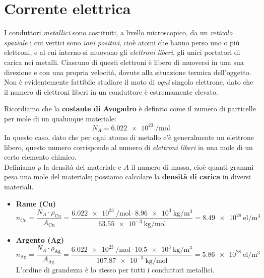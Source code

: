 \section{Corrente elettrica}
I conduttori \textit{metallici} sono costituiti, a livello microscopico, da un \textit{reticolo spaziale} i cui vertici sono \textit{ioni positivi}, cioè atomi che hanno perso uno o più elettroni, e al cui interno si muovono gli \textit{elettroni liberi}, gli unici portatori di carica nei metalli.
Ciascuno di questi elettroni è libero di muoversi in una sua direzione e con una propria velocità, dovute alla situazione termica dell'oggetto. Non è evidentemente fattibile studiare il moto di \textit{ogni} singolo elettrone, dato che il numero di elettroni liberi in un conduttore è estremamente elevato.
\begin{examplewt}
	Ricordiamo che la \textbf{costante di Avogadro} è definito come il numero di particelle per mole di un qualunque materiale:
	\begin{equation*}
		N_A=\SI[exponent-product=\ensuremath{\cdot}]{6,022e23}{\per\mole}
	\end{equation*}
	In questo caso, dato che per ogni atomo di metallo c'è generalmente un elettrone libero, questo numero corrisponde al numero di \textit{elettroni liberi} in una mole di un certo elemento chimico.\\
	Definiamo $\rho$ la densità del materiale e $A$ il numero di massa, cioè quanti grammi pesa una mole del materiale; possiamo calcolare la \textbf{densità di carica} in diversi materiali.
	\begin{itemize}
		\item \textbf{Rame (Cu)}
		\begin{equation*}
			n_{\textrm{Cu}}=\frac{N_A\cdot\rho_{\mathrm{Cu}}}{A_{\mathrm{Cu}}}=\frac{\SI[exponent-product=\ensuremath{\cdot}]{6,022e23}{\per\mole}\cdot\SI[exponent-product=\ensuremath{\cdot}]{8,96e3}{\kilogram\per\cubic\meter}}{\SI[exponent-product=\ensuremath{\cdot}]{63,55e-3}{\kilogram\per\mole}}=\SI[per-mode = fraction,exponent-product=\ensuremath{\cdot}]{8,49e28}{\mathrm{el}\per\cubic\metre}
		\end{equation*} 
		\item \textbf{Argento (Ag)}
		\begin{equation*}
			n_{\textrm{Ag}}=\frac{N_A\cdot\rho_{\mathrm{Ag}}}{A_{\mathrm{Ag}}}=\frac{\SI[exponent-product=\ensuremath{\cdot}]{6,022e23}{\per\mole}\cdot\SI[exponent-product=\ensuremath{\cdot}]{10,5e3}{\kilogram\per\cubic\meter}}{\SI[exponent-product=\ensuremath{\cdot}]{107,87e-3}{\kilogram\per\mole}}=\SI[per-mode = fraction,exponent-product=\ensuremath{\cdot}]{5,86e28}{\mathrm{el}\per\cubic\metre}
		\end{equation*}
	L'ordine di grandezza è lo stesso per tutti i conduttori metallici.
	\end{itemize} 
\end{examplewt}
